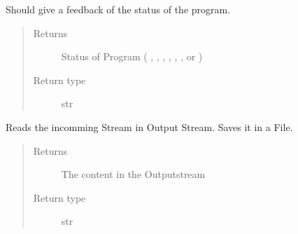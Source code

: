 \documentclass[letterpaper,10pt,english]{sphinxmanual}
\begin{document}
\begin{fulllineitems}
\begin{fulllineitems}
\label{\detokenize{anoog.automation:anoog.automation.py_exe_interface.Process_Interface.process_status}}
\sphinxAtStartPar
Should give a feedback of the status of the program.
\begin{quote}\begin{description}
\item[{Returns}] \leavevmode
\sphinxAtStartPar
Status of Program ( , , , , , ,  or )

\item[{Return type}] \leavevmode
\sphinxAtStartPar
str

\end{description}\end{quote}

\end{fulllineitems}


\begin{fulllineitems}
\label{\detokenize{anoog.automation:anoog.automation.py_exe_interface.Process_Interface.read}}
\sphinxAtStartPar
Reads the incomming Stream in Output Stream.
Saves it in a File.
\begin{quote}\begin{description}
\item[{Returns}] \leavevmode
\sphinxAtStartPar
The content in the Outputstream

\item[{Return type}] \leavevmode
\sphinxAtStartPar
str

\end{description}\end{quote}

\end{fulllineitems}



\end{fulllineitems}
\end{document}
